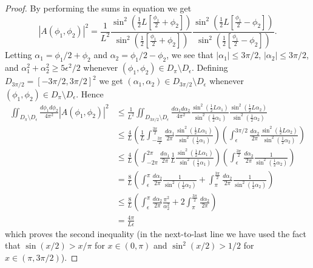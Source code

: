 \documentclass[../thesis-main/thesis-main]{subfiles}
\begin{document}
\begin{proof}
By performing the sums in equation  we get 
\begin{equation}
|A(\phi_{1},\phi_{2})|^{2}
=\frac{1}{L^{2}}\frac{\sin^{2}(\frac{1}{2}L[\frac{\phi_1}{2}+\phi_{2}])} {\sin^{2}(\frac{1}{2}[\frac{\phi_1}{2}+\phi_{2}])}
\frac{\sin^{2}(\frac{1}{2}L[\frac{\phi_1}{2} -\phi_{2}])}
{\sin^{2}(\frac{1}{2}[\frac{\phi_1}{2}-\phi_{2}])}.
\label{eq:A_summed}
\end{equation}
Letting $\alpha_{1}={\phi_1}/{2}+\phi_{2}$ and
$\alpha_{2}={\phi_1}/{2}-\phi_{2}$, we see that
$|\alpha_{1}|\leq 3\pi/2$, $|\alpha_{2}|\leq 3\pi/2$,
and $\alpha_{1}^{2}+\alpha_{2}^{2}\geq  5\epsilon^{2}/2$ whenever
$(\phi_{1},\phi_{2})\in D_{\pi}\setminus D_{\epsilon}$. Defining
$D_{3\pi/2}=[-3\pi/2,3\pi/2]^{2}$
we get $(\alpha_{1},\alpha_{2})\in D_{3\pi/2}\setminus D_{\epsilon}$
whenever $(\phi_{1},\phi_{2})\in D_{\pi}\setminus D_{\epsilon}$.
Hence 
\begin{align*}
\iint_{D_{\pi}\setminus D_{\epsilon}}\frac{d\phi_{1}d\phi_{2}}{4\pi^{2}}|A(\phi_{1},\phi_{2})|^{2} 
	& \leq \frac{1}{L^{2}} \iint_{D_{3\pi/2}\setminus D_{\epsilon}} \frac{d\alpha_{1}d\alpha_{2}}{4\pi^{2}}
	\frac{\sin^{2}(\frac{1}{2}L\alpha_{1})}{\sin^{2}
	(\frac{1}{2}\alpha_{1})}\frac{\sin^{2}(\frac{1}{2}L\alpha_{2})}
	{\sin^{2}(\frac{1}{2}\alpha_{2})}\\
 & \leq  \frac{4}{L}\left(\frac{1}{L}\int_{-\frac{3\pi}{2}}^{\frac{3\pi}{2}}\frac{d\alpha_{1}}{2\pi}\frac{\sin^{2}(
 	\frac{1}{2}L\alpha_{1})}{\sin^{2}(\frac{1}{2}\alpha_{1})}\right)
 	\left(\int_{\epsilon}^{3\pi/2}\frac{d\alpha_{2}}{2\pi}\frac{\sin^{2}(\frac{1}{2}L\alpha_{2})}
 	{\sin^{2}(\frac{1}{2}\alpha_{2})}\right)\\
 & \leq  \frac{4}{L}\left(\int_{-2\pi}^{2\pi}\frac{d\alpha_{1}}{2\pi}\frac{1}{L}\frac{\sin^{2}(\frac{1}{2}L\alpha_{1})}{\sin^{2}(\frac{1}{2}\alpha_{1})}\right)\left(\int_{\epsilon}^{\frac{3\pi}{2}}\frac{d\alpha_{2}}{2\pi}\frac{1}{\sin^{2}(\frac{1}{2}\alpha_{2})}\right)\\
 & = \frac{8}{L} \left(\int_{\epsilon}^{\pi}\frac{d\alpha_{2}}{2\pi}\frac{1}{\sin^{2}(\frac{1}{2}\alpha_{2})}+\int_{\pi}^{\frac{3\pi}{2}}\frac{d\alpha_{2}}{2\pi}\frac{1}{\sin^{2}(\frac{1}{2}\alpha_{2})}\right)\\
 & \leq  \frac{8}{L}\left(\int_{\epsilon}^{\pi}\frac{d\alpha_{2}}{2\pi}\frac{\pi^{2}}{\alpha_{2}^{2}}+2\int_{\pi}^{\frac{3\pi}{2}}\frac{d\alpha_{2}}{2\pi}\right)\\
 & =  \frac{4\pi}{L\epsilon}
 \end{align*}
which proves the second inequality (in the next-to-last line we
have used the fact that $\sin({x}/{2})>{x}/{\pi}$ for $x \in (0,\pi)$
and $\sin^{2}({x}/{2})>{1}/{2}$ for $x \in (\pi,{3\pi}/{2})$).


\end{proof}
\end{document}
